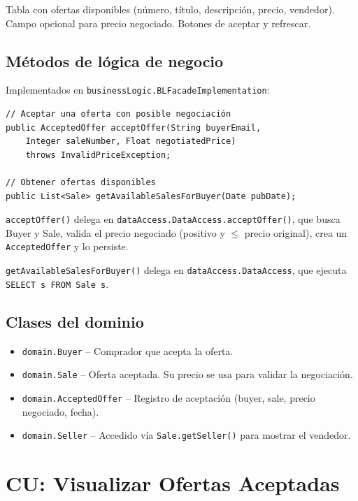 \documentclass[12pt,a4paper]{article}
\begin{document}
Tabla con ofertas disponibles (número, título, descripción, precio, vendedor). Campo opcional para precio negociado. Botones de aceptar y refrescar.

\subsection{Métodos de lógica de negocio}

Implementados en \texttt{businessLogic.BLFacadeImplementation}:

\begin{lstlisting}
// Aceptar una oferta con posible negociación
public AcceptedOffer acceptOffer(String buyerEmail,
    Integer saleNumber, Float negotiatedPrice)
    throws InvalidPriceException;

// Obtener ofertas disponibles
public List<Sale> getAvailableSalesForBuyer(Date pubDate);
\end{lstlisting}

\texttt{acceptOffer()} delega en \texttt{dataAccess.DataAccess.acceptOffer()}, que busca Buyer y Sale, valida el precio negociado (positivo y $\leq$ precio original), crea un \texttt{AcceptedOffer} y lo persiste.

\texttt{getAvailableSalesForBuyer()} delega en \texttt{dataAccess.DataAccess}, que ejecuta \texttt{SELECT s FROM Sale s}.

\subsection{Clases del dominio}

\begin{itemize}
    \item \texttt{domain.Buyer} -- Comprador que acepta la oferta.
    \item \texttt{domain.Sale} -- Oferta aceptada. Su precio se usa para validar la negociación.
    \item \texttt{domain.AcceptedOffer} -- Registro de aceptación (buyer, sale, precio negociado, fecha).
    \item \texttt{domain.Seller} -- Accedido vía \texttt{Sale.getSeller()} para mostrar el vendedor.
\end{itemize}

\section{CU: Visualizar Ofertas Aceptadas}
\end{document}
